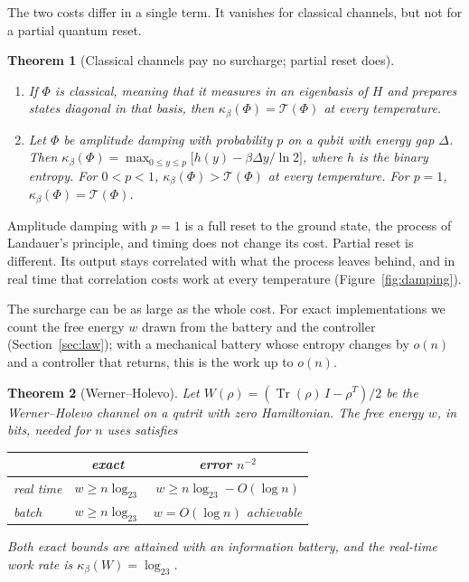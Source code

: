 \documentclass[11pt]{article}
\newtheorem{theorem}{Theorem}
\theoremstyle{definition}
\theoremstyle{remark}
\newcommand{\Tr}{\operatorname{Tr}}
\newcommand{\Tcap}{\mathcal T}
\newcommand{\Trt}{\kappa_\beta}
\begin{document}
The two costs differ in a single term. It vanishes for classical channels, but not for a partial quantum reset.

\begin{theorem}[Classical channels pay no surcharge; partial reset does]\label{thm:classical}\leavevmode
\begin{enumerate}[label=(\alph*), leftmargin=*]
\item If $\Phi$ is classical, meaning that it measures in an eigenbasis of $H$ and prepares states diagonal in that basis, then $\Trt(\Phi)=\Tcap(\Phi)$ at every temperature.
\item Let $\Phi$ be amplitude damping with probability $p$ on a qubit with energy gap $\Delta$. Then $\Trt(\Phi)=\max_{0\le y\le p}\bigl[h(y)-\beta\Delta y/\ln 2\bigr]$, where $h$ is the binary entropy. For $0<p<1$, $\Trt(\Phi)>\Tcap(\Phi)$ at every temperature. For $p=1$, $\Trt(\Phi)=\Tcap(\Phi)$.
\end{enumerate}
\end{theorem}

Amplitude damping with $p=1$ is a full reset to the ground state, the process of Landauer's principle, and timing does not change its cost. Partial reset is different. Its output stays correlated with what the process leaves behind, and in real time that correlation costs work at every temperature (Figure~\ref{fig:damping}).

The surcharge can be as large as the whole cost. For exact implementations we count the free energy $w$ drawn from the battery and the controller (Section~\ref{sec:law}); with a mechanical battery whose entropy changes by $o(n)$ and a controller that returns, this is the work up to $o(n)$.

\begin{theorem}[Werner--Holevo]\label{thm:werner}
Let $W(\rho)=(\Tr(\rho)\,I-\rho^{T})/2$ be the Werner--Holevo channel on a qutrit with zero Hamiltonian. The free energy $w$, in bits, needed for $n$ uses satisfies
\begin{center}
\begin{tabular}{lcc}
\toprule
 & exact & error $n^{-2}$\\
\midrule
real time & $w\ge n\log_23$ & $w\ge n\log_23-O(\log n)$\\
batch & $w\ge n\log_23$ & $w=O(\log n)$ achievable\\
\bottomrule
\end{tabular}
\end{center}
Both exact bounds are attained with an information battery, and the real-time work rate is $\Trt(W)=\log_23$.
\end{theorem}
\end{document}
